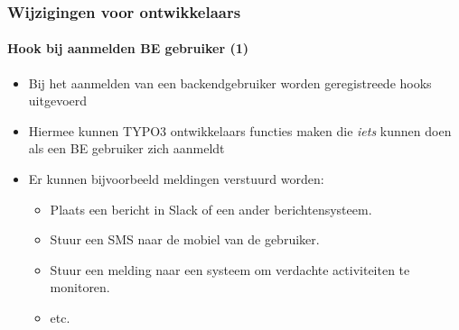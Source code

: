 
\begin{frame}[fragile]
	\frametitle{Wijzigingen voor ontwikkelaars}
	\framesubtitle{Hook bij aanmelden BE gebruiker (1)}

	\lstset{basicstyle=\tiny\ttfamily}

	\begin{itemize}
		\item Bij het aanmelden van een backendgebruiker worden geregistreede hooks uitgevoerd
		\item Hiermee kunnen TYPO3 ontwikkelaars functies maken die
			\textit{iets} kunnen doen als een BE gebruiker zich aanmeldt

		\item Er kunnen bijvoorbeeld meldingen verstuurd worden:

			\begin{itemize}
				\item Plaats een bericht in Slack of een ander berichtensysteem.
				\item Stuur een SMS naar de mobiel van de gebruiker.
				\item Stuur een melding naar een systeem om verdachte activiteiten te monitoren.
				\item etc.
			\end{itemize}

	\end{itemize}

\end{frame}


